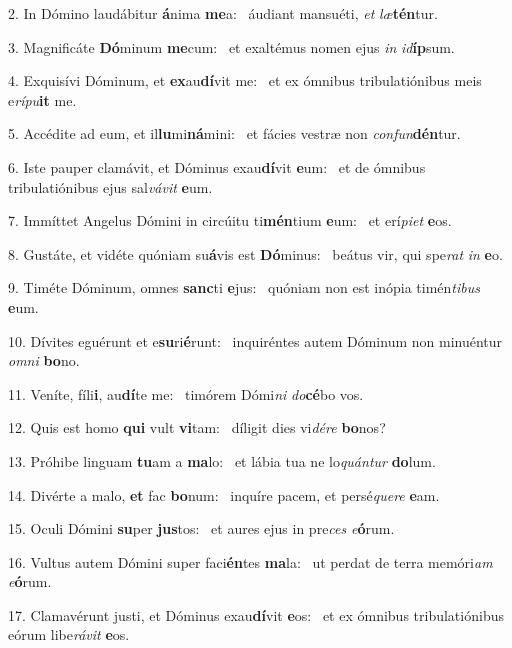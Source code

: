 2. In Dómino laudábitur \textbf{á}nima \textbf{me}a: \ast\  áudiant mansuéti, \textit{et} \textit{læ}\textbf{tén}tur.\

3. Magnificáte \textbf{Dó}minum \textbf{me}cum: \ast\  et exaltémus nomen ejus \textit{in} \textit{id}\textbf{íp}sum.\

4. Exquisívi Dóminum, et \textbf{ex}au\textbf{dí}vit me: \ast\  et ex ómnibus tribulatiónibus meis e\textit{rí}\textit{pu}\textbf{it} me.\

5. Accédite ad eum, et il\textbf{lu}mi\textbf{ná}mini: \ast\  et fácies vestræ non \textit{con}\textit{fun}\textbf{dén}tur.\

6. Iste pauper clamávit, et Dóminus exau\textbf{dí}vit \textbf{e}um: \ast\  et de ómnibus tribulatiónibus ejus sal\textit{vá}\textit{vit} \textbf{e}um.\

7. Immíttet Angelus Dómini in circúitu ti\textbf{mén}tium \textbf{e}um: \ast\  et erí\textit{pi}\textit{et} \textbf{e}os.\

8. Gustáte, et vidéte quóniam su\textbf{á}vis est \textbf{Dó}minus: \ast\  beátus vir, qui spe\textit{rat} \textit{in} \textbf{e}o.\

9. Timéte Dóminum, omnes \textbf{sanc}ti \textbf{e}jus: \ast\  quóniam non est inópia timén\textit{ti}\textit{bus} \textbf{e}um.\

10. Dívites eguérunt et e\textbf{su}ri\textbf{é}runt: \ast\  inquiréntes autem Dóminum non minuéntur \textit{om}\textit{ni} \textbf{bo}no.\

11. Veníte, fíli\textbf{i}, au\textbf{dí}te me: \ast\  timórem Dómi\textit{ni} \textit{do}\textbf{cé}bo vos.\

12. Quis est homo \textbf{qui} vult \textbf{vi}tam: \ast\  díligit dies vi\textit{dé}\textit{re} \textbf{bo}nos?\

13. Próhibe linguam \textbf{tu}am a \textbf{ma}lo: \ast\  et lábia tua ne lo\textit{quán}\textit{tur} \textbf{do}lum.\

14. Divérte a malo, \textbf{et} fac \textbf{bo}num: \ast\  inquíre pacem, et persé\textit{que}\textit{re} \textbf{e}am.\

15. Oculi Dómini \textbf{su}per \textbf{jus}tos: \ast\  et aures ejus in pre\textit{ces} \textit{e}\textbf{ó}rum.\

16. Vultus autem Dómini super faci\textbf{én}tes \textbf{ma}la: \ast\  ut perdat de terra memóri\textit{am} \textit{e}\textbf{ó}rum.\

17. Clamavérunt justi, et Dóminus exau\textbf{dí}vit \textbf{e}os: \ast\  et ex ómnibus tribulatiónibus eórum libe\textit{rá}\textit{vit} \textbf{e}os.\

